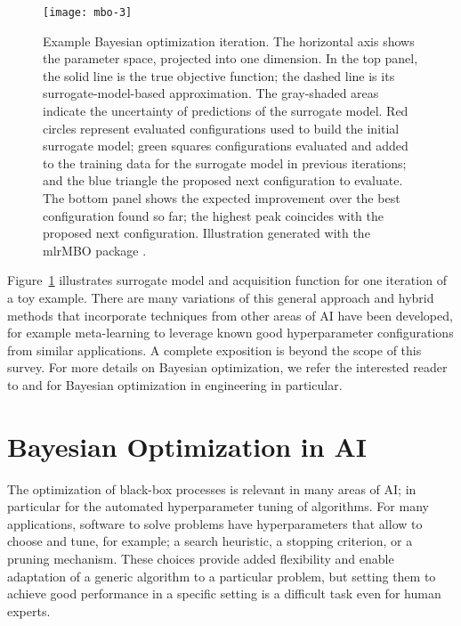 \documentclass{article}
\begin{document}
\begin{figure}[htb]
\begin{center}
    \texttt{[image: mbo-3]}
    \caption{Example Bayesian optimization iteration. The horizontal axis shows
        the parameter space, projected into one dimension. In the top panel, the
        solid line is the true objective function; the dashed line is its
        surrogate-model-based approximation. The gray-shaded areas indicate the
        uncertainty of predictions of the surrogate model. Red circles represent
        evaluated configurations used to build the initial surrogate model;
        green squares configurations evaluated and added to the training data
        for the surrogate model in previous iterations; and the blue triangle
        the proposed next configuration to evaluate. The bottom panel shows the
        expected improvement over the best configuration found so far; the
        highest peak coincides with the proposed next configuration.
        Illustration generated with the \mbox{mlrMBO} package
        \protect\cite{bischl_mlrmbo_2017}.}
    \label{fig:mbo}
\end{center}
\end{figure}

Figure~\ref{fig:mbo} illustrates surrogate model and acquisition function for
one iteration of a toy example. There are many variations of this general
approach and hybrid methods that incorporate techniques from other areas of AI
have been developed, for example meta-learning to leverage known good
hyperparameter configurations from similar applications. A complete exposition
is beyond the scope of this survey. For more details on Bayesian optimization,
we refer the interested reader to
\cite{jones_efficient_1998,mockus_bayesian_1991} and
\cite{forrester_engineering_2008} for Bayesian optimization in engineering in
particular.

\section{Bayesian Optimization in AI}

The optimization of black-box processes is relevant in many areas of AI; in
particular for the automated hyperparameter tuning of algorithms. For many
applications, software to solve problems have hyperparameters that allow to
choose and tune, for example; a search heuristic, a stopping criterion, or a
pruning mechanism. These choices provide added flexibility and enable adaptation
of a generic algorithm to a particular problem, but setting them to achieve good
performance in a specific setting is a difficult task even for human experts.
\end{document}

